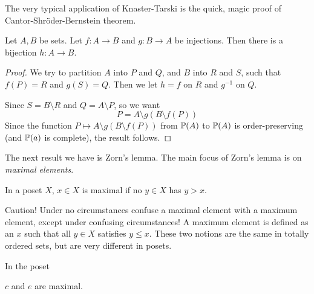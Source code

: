 \documentclass[a4paper]{article}
\begin{document}
The very typical application of Knaster-Tarski is the quick, magic proof of Cantor-Shr\"oder-Bernstein theorem.
\begin{cor}
  Let $A, B$ be sets. Let $f: A\to B$ and $g: B\to A$ be injections. Then there is a bijection $h: A\to B$.
\end{cor}

\begin{proof}
  We try to partition $A$ into $P$ and $Q$, and $B$ into $R$ and $S$, such that $f(P) = R$ and $g(S) = Q$. Then we let $h = f$ on $R$ and $g^{-1}$ on $Q$.
  \begin{center}
  \end{center}
  Since $S = B\setminus R$ and $Q = A \setminus P$, so we want
  \[
    P = A\setminus g(B\setminus f(P))
  \]
  Since the function $P \mapsto A\setminus g(B\setminus f(P))$ from $\P(A)$ to $\P(A)$ is order-preserving (and $\P(a)$ is complete), the result follows.
\end{proof}

The next result we have is Zorn's lemma. The main focus of Zorn's lemma is on \emph{maximal elements}.
\begin{defi}
  In a poset $X$, $x\in X$ is maximal if no $y\in X$ has $y > x$.
\end{defi}
Caution! Under no circumstances confuse a maximal element with a maximum element, except under confusing circumstances! A maximum element is defined as an $x$ such that all $y\in X$ satisfies $y \leq x$. These two notions are the same in totally ordered sets, but are very different in posets.

\begin{eg}
  In the poset
  \begin{center}
  \end{center}
  $c$ and $e$ are maximal.
\end{eg}
\end{document}

